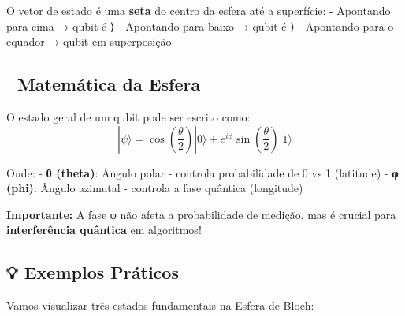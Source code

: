 \documentclass[
  brazilian,
]{report}
\begin{document}
O vetor de estado é uma \textbf{seta} do centro da esfera até a
superfície: - Apontando para cima → qubit é ⟩ - Apontando para
baixo → qubit é ⟩ - Apontando para o equador → qubit em
superposição

\subsection{📐 Matemática da Esfera}\label{matemuxe1tica-da-esfera}

O estado geral de um qubit pode ser escrito como:
\[|\psi\rangle = \cos\left(\frac{\theta}{2}\right)|0\rangle + e^{i\phi}\sin\left(\frac{\theta}{2}\right)|1\rangle\]

Onde: - \textbf{θ (theta)}: Ângulo polar - controla probabilidade de 0
vs 1 (latitude) - \textbf{φ (phi)}: Ângulo azimutal - controla a fase
quântica (longitude)

\textbf{Importante:} A fase φ não afeta a probabilidade de medição, mas
é crucial para \textbf{interferência quântica} em algoritmos!

\subsection{💡 Exemplos Práticos}\label{exemplos-pruxe1ticos}

Vamos visualizar três estados fundamentais na Esfera de Bloch:
\end{document}
